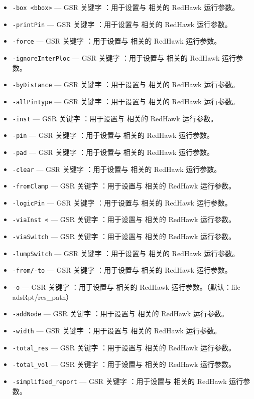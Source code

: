 \begin{itemize}
\item \texttt{-box <bbox>} — GSR 关键字 ：用于设置与  相关的 RedHawk 运行参数。
\item \texttt{-printPin} — GSR 关键字 ：用于设置与  相关的 RedHawk 运行参数。
\item \texttt{-force} — GSR 关键字 ：用于设置与  相关的 RedHawk 运行参数。
\item \texttt{-ignoreInterPloc} — GSR 关键字 ：用于设置与  相关的 RedHawk 运行参数。
\item \texttt{-byDistance} — GSR 关键字 ：用于设置与  相关的 RedHawk 运行参数。
\item \texttt{-allPintype} — GSR 关键字 ：用于设置与  相关的 RedHawk 运行参数。
\item \texttt{-inst} — GSR 关键字 ：用于设置与  相关的 RedHawk 运行参数。
\item \texttt{-pin} — GSR 关键字 ：用于设置与  相关的 RedHawk 运行参数。
\item \texttt{-pad} — GSR 关键字 ：用于设置与  相关的 RedHawk 运行参数。
\item \texttt{-clear} — GSR 关键字 ：用于设置与  相关的 RedHawk 运行参数。
\item \texttt{-fromClamp} — GSR 关键字 ：用于设置与  相关的 RedHawk 运行参数。
\item \texttt{-logicPin} — GSR 关键字 ：用于设置与  相关的 RedHawk 运行参数。
\item \texttt{-viaInst <} — GSR 关键字 ：用于设置与  相关的 RedHawk 运行参数。
\item \texttt{-viaSwitch} — GSR 关键字 ：用于设置与  相关的 RedHawk 运行参数。
\item \texttt{-lumpSwitch} — GSR 关键字 ：用于设置与  相关的 RedHawk 运行参数。
\item \texttt{-from/-to} — GSR 关键字 ：用于设置与  相关的 RedHawk 运行参数。
\item \texttt{-o} — GSR 关键字 ：用于设置与  相关的 RedHawk 运行参数。（默认：file adsRpt/res\_path）
\item \texttt{-addNode} — GSR 关键字 ：用于设置与  相关的 RedHawk 运行参数。
\item \texttt{-width} — GSR 关键字 ：用于设置与  相关的 RedHawk 运行参数。
\item \texttt{-total\_res} — GSR 关键字 ：用于设置与  相关的 RedHawk 运行参数。
\item \texttt{-total\_vol} — GSR 关键字 ：用于设置与  相关的 RedHawk 运行参数。
\item \texttt{-simplified\_report} — GSR 关键字 ：用于设置与  相关的 RedHawk 运行参数。

\end{itemize}
